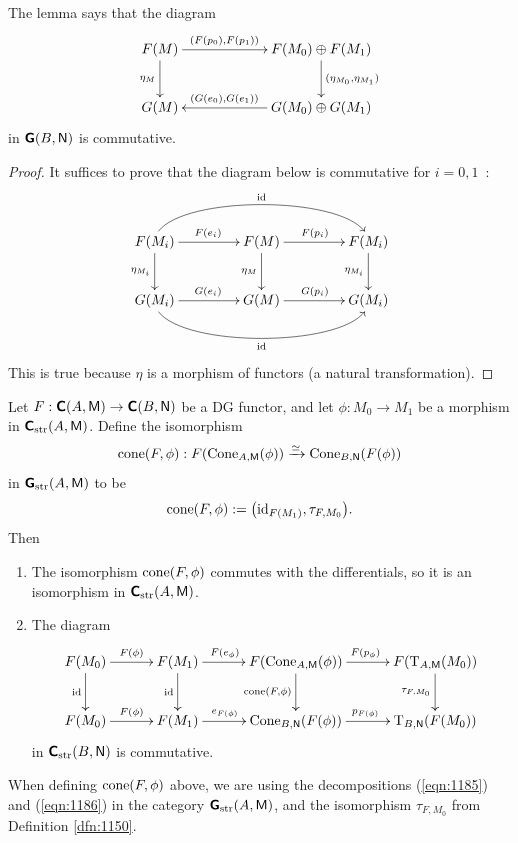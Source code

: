 The lemma says that the diagram 
\[ \UseTips  \xymatrix @C=14ex @R=6ex {
F(M) 
\ar[r]^(0.4){ (F(p_0), F(p_1)) }
\ar[d]_{ \eta_M }
& 
F(M_0) \oplus F(M_1)
\ar[d]^{ (\eta_{M_0}, \eta_{M_1}) }
\\
G(M)
& 
G(M_0) \oplus G(M_1)
\ar[l]_(0.6){ (G(e_0), G(e_1)) }
} \]
in $\boldsymbol{\mathsf{G}}(B, \operatorname{\mathsf{N}})$ is commutative. 

\begin{proof}
It suffices to prove that the diagram below is commutative for $i = 0, 1$~:
\[ \UseTips  \xymatrix @C=10ex @R=6ex {
F(M_i)
\ar[r]^{ F(e_i) }
\ar[d]_{ \eta_{M_i} }
\ar@(u,u)[rr]^{ \opn{id} }
&
F(M) 
\ar[r]^{ F(p_i) }
\ar[d]_{ \eta_M }
& 
F(M_i) 
\ar[d]_{ \eta_{M_i} }
\\
G(M_i)
\ar[r]^{ G(e_i) }
\ar@(d,d)[rr]_{ \opn{id} }
&
G(M)
\ar[r]^{ G(p_i) }
& 
G(M_i) 
} \]
This is true because $\eta$ is a morphism of functors (a natural 
transformation). 
\end{proof}

\begin{thm} \label{thm:1185}
Let 
$F : \boldsymbol{\mathsf{C}}(A, \operatorname{\mathsf{M}}) \to \boldsymbol{\mathsf{C}}(B, \operatorname{\mathsf{N}})$
be a DG functor, and let 
$\phi : M_0 \to M_1$ be a morphism in $\boldsymbol{\mathsf{C}}_{\mathrm{str}}(A, \operatorname{\mathsf{M}})$.
Define the isomorphism 
\[ \operatorname{cone}(F, \phi) : F (\operatorname{Cone}_{A, \operatorname{\mathsf{M}}}(\phi)) \xrightarrow{\simeq} 
\operatorname{Cone}_{B, \operatorname{\mathsf{N}}} (F(\phi))  \]
in  $\boldsymbol{\mathsf{G}}_{\mathrm{str}}(A, \operatorname{\mathsf{M}})$ to be 
\[ \operatorname{cone}(F, \phi) := 
\bigl( \operatorname{id}_{F(M_1)}, \tau_{F, M_0} \bigr) . \]
Then\tup{:}
\begin{enumerate}
\item The isomorphism $\operatorname{cone}(F, \phi)$ commutes with the differentials, 
so it is an isomorphism in $\boldsymbol{\mathsf{C}}_{\mathrm{str}}(A, \operatorname{\mathsf{M}})$. 

\item The diagram 
\[ \UseTips  \xymatrix @C=7ex @R=6ex {
F(M_0) 
\ar[r]^{F(\phi)}
\ar[d]_{\opn{id}}
& 
F(M_1) 
\ar[r]^(0.4){F(e_{\phi})}
\ar[d]_{\opn{id}}
& 
F(\opn{Cone}_{A, \cat{M}}(\phi))
\ar[r]^{F(p_{\phi})}
\ar[d]_{\opn{cone}(F, \phi)}
& 
F(\opn{T}_{A, \cat{M}}(M_0))
\ar[d]_{ \tau_{F, M_0}}
\\
F(M_0)
\ar[r]^{F(\phi)}
& 
F(M_1)
\ar[r]^(0.4){e_{F(\phi)}}
& 
\opn{Cone}_{B, \cat{N}}(F(\phi))
\ar[r]^{p_{F(\phi)}}
& 
\opn{T}_{B, \cat{N}}(F(M_0))
} \]
in $\boldsymbol{\mathsf{C}}_{\mathrm{str}}(B, \operatorname{\mathsf{N}})$ is commutative. 
\end{enumerate}
\end{thm}

When defining $\operatorname{cone}(F, \phi)$ above, we are using the decompositions 
(\ref{eqn:1185}) and  (\ref{eqn:1186}) in the category 
$\boldsymbol{\mathsf{G}}_{\mathrm{str}}(A, \operatorname{\mathsf{M}})$, 
and the isomorphism $\tau_{F, M_0}$ from Definition 
\ref{dfn:1150}.

